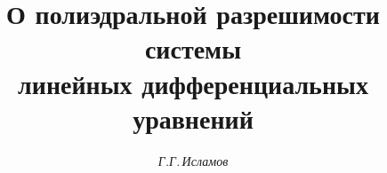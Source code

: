 









\newcommand{\const}{\operatorname{const}}


\newcommand{\tts}[1]{}







 


\setcounter{page}{31}















\author{\it Г.Г.\,Исламов}




\title{О полиэдральной разрешимости системы \\


линейных дифференциальных уравнений}





\date{}




\pagestyle{plain} %







\maketitle


